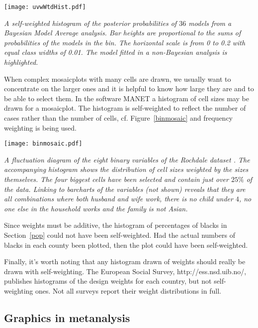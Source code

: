 \documentclass{svmult}
\begin{document}
\begin{center}
      \texttt{[image: uvwWtdHist.pdf]}
      \caption{\label{uvw}\em A self-weighted histogram of the posterior probabilities of $36$ models from a Bayesian Model Average analysis.  Bar heights are proportional to the sums of probabilities of the models in the bin.  The horizontal scale is from 0 to 0.2 with equal class widths of 0.01.   The model fitted in a non-Bayesian analysis is highlighted.}
      \end{center}
      
      When complex mosaicplots with many cells are drawn, we usually want to concentrate on the larger ones and it is helpful to know how large they are and to be able to select them.  In the software MANET \citep{unwin:1996} a histogram of cell sizes may be drawn for a mosaicplot.  The histogram is self-weighted to reflect the number of cases rather than the number of cells, cf. Figure~\ref{binmosaic} and frequency weighting is being used.


\begin{center}
      \texttt{[image: binmosaic.pdf]}
      \caption{\label{binmosaic}\em A fluctuation diagram of the eight binary variables of the Rochdale dataset \citep{whittaker:1990}.   The accompanying histogram shows the distribution of cell sizes weighted by the sizes themselves.  The four biggest cells have been selected and contain just over $25\%$ of the data.  Linking to barcharts of the variables (not shown) reveals that they are all combinations where both husband and wife work, there is no child under $4$, no one else in the household works and the family is not Asian.}
      \end{center}

Since weights must be additive, the histogram of percentages of blacks in Section~\ref{pop} could not have been self-weighted.  Had the actual numbers of blacks in each county been plotted, then the plot could have been self-weighted.

Finally, it's worth noting that any histogram drawn of weights should really be drawn with self-weighting.  The European Social Survey, http://ess.nsd.uib.no/, publishes histograms of the design weights for each country, but not self-weighting ones.  Not all surveys report their weight distributions in full.
\newpage
\subsection{Graphics in metanalysis}
\label{meta}
\end{document}
